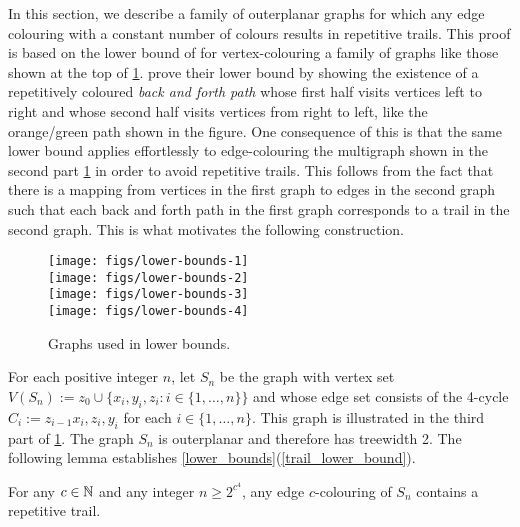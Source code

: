 \documentclass[kpfonts]{patmorin}
\begin{document}
In this section, we describe a family of outerplanar graphs for which any edge colouring with a constant number of colours results in repetitive trails. This proof is based on the lower bound of \citet{carmi.dujmovic.ea:anagram-free} for vertex-colouring a family of graphs like those shown at the top of \cref{lower_bound_figs}.  \citet{carmi.dujmovic.ea:anagram-free} prove their lower bound by showing the existence of a repetitively coloured \emph{back and forth path} whose first half visits vertices left to right and whose second half visits vertices from right to left, like the orange/green path shown in the figure.  One consequence of this is that the same lower bound applies effortlessly to edge-colouring the multigraph shown in the second part \cref{lower_bound_figs} in order to avoid repetitive trails. This follows from the fact that there is a mapping from vertices in the first graph to edges in the second graph such that each back and forth path in the first graph corresponds to a trail in the second graph.  This is what motivates the following construction.

\begin{figure}
    \begin{center}
        \texttt{[image: figs/lower-bounds-1]} \\
        \texttt{[image: figs/lower-bounds-2]} \\
        \texttt{[image: figs/lower-bounds-3]} \\[2ex]
        \texttt{[image: figs/lower-bounds-4]}
    \end{center}
    \caption{Graphs used in lower bounds.}
    \label{lower_bound_figs}
\end{figure}

For each positive integer $n$, let $S_n$ be the graph with vertex set $V(S_n):=z_0\cup\{x_i,y_i,z_i:i\in\{1,\ldots,n\}\}$ and whose edge set consists of the 4-cycle $C_i:=z_{i-1}x_i,z_i,y_i$ for each $i\in\{1,\ldots,n\}$.  This graph is illustrated in the third part of \cref{lower_bound_figs}. The graph $S_n$ is outerplanar and therefore has treewidth 2.  The following lemma establishes \cref{lower_bounds}(\ref{trail_lower_bound}).

\begin{lem}\label{trail_lower_bound_lemma}
    For any $c\in\mathbb{N}$ and any integer $n\ge 2^{c^4}$, any edge $c$-colouring of $S_n$ contains a repetitive trail.
\end{lem}
\end{document}
